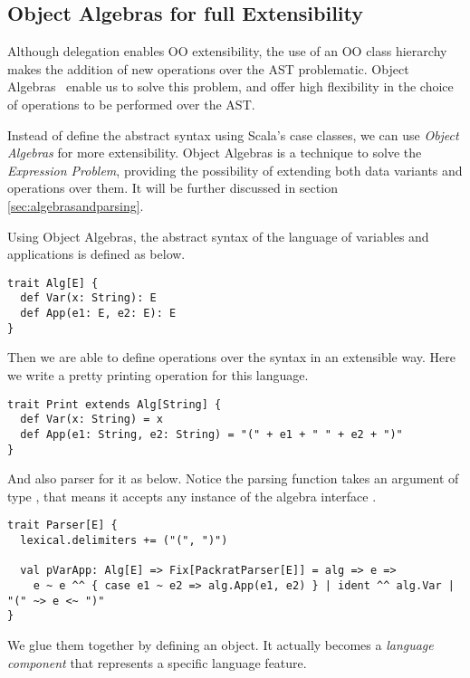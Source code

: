 \subsection{Object Algebras for full Extensibility}\label{subsec:overview-oa}

Although delegation enables OO extensibility, the use of an OO class
hierarchy makes the addition of new operations over the AST
problematic. Object Algebras~\cite{} enable us to solve this problem, and
offer high flexibility in the choice of operations to be performed
over the AST.


Instead of define the abstract syntax using Scala's case classes, we
can use \textit{Object Algebras} for more extensibility. Object
Algebras is a technique to solve the \textit{Expression Problem},
providing the possibility of extending both data variants and
operations over them. It will be further discussed in section
\ref{sec:algebrasandparsing}.

Using Object Algebras, the abstract syntax of the language of variables and applications is defined as below.

\begin{lstlisting}
trait Alg[E] {
  def Var(x: String): E
  def App(e1: E, e2: E): E
}
\end{lstlisting}

Then we are able to define operations over the syntax in an extensible way. Here we write a pretty printing operation for this language.

\begin{lstlisting}
trait Print extends Alg[String] {
  def Var(x: String) = x
  def App(e1: String, e2: String) = "(" + e1 + " " + e2 + ")"
}
\end{lstlisting}

And also parser for it as below. Notice the parsing function  takes an argument of type , that means it accepts any instance of the algebra interface .

\begin{lstlisting}
trait Parser[E] {
  lexical.delimiters += ("(", ")")

  val pVarApp: Alg[E] => Fix[PackratParser[E]] = alg => e =>
    e ~ e ^^ { case e1 ~ e2 => alg.App(e1, e2) } | ident ^^ alg.Var | "(" ~> e <~ ")"
}
\end{lstlisting}

We glue them together by defining an object. It actually becomes a \textit{language component} that represents a specific language feature.


